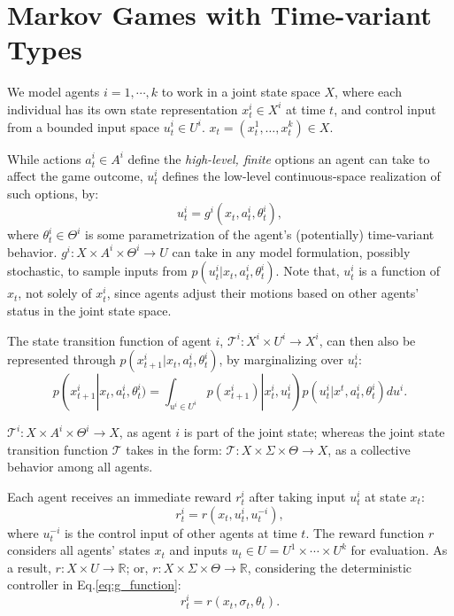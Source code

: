 \documentclass[letterpaper, 10 pt, conference]{ieeeconf}  %
\begin{document}
\section{Markov Games with Time-variant Types}
We model agents $i = 1,\cdots ,k$ to work in a joint state space $X$, where each individual has its own state 
representation $x_t^i \in X^i$ at time $t$, and control input from a bounded 
input space $u_t^i \in U^i$. $x_t = (x^1_t,\ldots,x^k_t) \in X$.

While actions $a_t^i \in A^i$ define the \textit{high-level, finite} options an 
agent can take to affect the game outcome, $u_t^i$ defines the low-level continuous-space
realization of such options, by:
\begin{equation}\label{eq:g_function}
  u_t^i = g^i(x_t, a^i_t, \theta^i_t),
\end{equation}
where $\theta^i_t \in \Theta^i$ is some parametrization of the agent's 
(potentially) time-variant behavior. 
$g^i:X \times A^i \times \Theta^i \rightarrow U$ can take in any model 
formulation, 
possibly stochastic, to sample inputs from $p(u_t^i|x_t,a^i_t,\theta_t^i)$. 
Note that, $u_t^i$ is a function of $x_t$, not solely of $x^i_t$, since agents 
adjust their motions based on other agents' status in the joint state space.

The state transition function of agent $i$, 
$\mathcal{T}^i:X^i \times U^i \rightarrow X^i$, can then also be represented 
through
$p(x^i_{t+1}|x_t,a^i_t,\theta^i_t)$, by marginalizing over $u^i_t$:
\begin{equation}
  p(x^i_{t+1}|x_t,a^i_t,\theta^i_t) = \int_{u^i \in U^i} 
  p(x_{t+1}^i)|x^i_t,u^i_t) p(u^i_t|x^t,a^i_t,\theta^i_t)du^i.
\end{equation}

$\mathcal{T}^i:X \times A^i \times \Theta^i \rightarrow X$, as agent $i$ is 
part of the joint state; whereas the joint 
state transition function $\mathcal{T}$ takes in the form: 
$\mathcal{T}:X \times \Sigma \times \Theta \rightarrow X$, as a collective 
behavior among all agents. 

Each agent receives an immediate reward $r^i_t$ 
after taking input $u_t^i$ at state $x_t$:
\begin{equation}\label{eq:r_control_input}
  r^i_t = r(x_t,u^i_t,u^{-i}_t),
\end{equation}
where $u^{-i}_t$ is the control input of other agents at time $t$. The reward 
function $r$ considers all agents' states $x_t$ and inputs 
$u_t \in U = U^1\times \cdots \times U^k$ for evaluation.
As a result, $r: X \times U \rightarrow \mathbb{R}$; or, 
$r: X\times \Sigma \times \Theta \rightarrow \mathbb{R}$, considering the 
deterministic controller in Eq.\ref{eq:g_function}:
\begin{equation}\label{eq:r_function}
  r^i_t = r(x_t,\sigma_t,\theta_t).
\end{equation}
\end{document}
